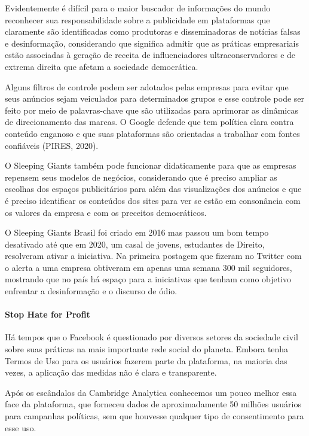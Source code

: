 Evidentemente é difícil para o maior buscador de informações do mundo
reconhecer sua responsabilidade sobre a publicidade em plataformas que
claramente são identificadas como produtoras e disseminadoras de
notícias falsas e desinformação, considerando que significa admitir que
as práticas empresariais estão associadas à geração de receita de
influenciadores ultraconservadores e de extrema direita que afetam a
sociedade democrática.

Alguns filtros de controle podem ser adotados pelas empresas para evitar
que seus anúncios sejam veiculados para determinados grupos e esse
controle pode ser feito por meio de palavras-chave que são utilizadas
para aprimorar as dinâmicas de direcionamento das marcas. O Google
defende que tem política clara contra conteúdo enganoso e que suas
plataformas são orientadas a trabalhar com fontes confiáveis (PIRES,
2020).

O Sleeping Giants também pode funcionar didaticamente para que as
empresas repensem seus modelos de negócios, considerando que é preciso
ampliar as escolhas dos espaços publicitários para além das
visualizações dos anúncios e que é preciso identificar os conteúdos dos
sites para ver se estão em consonância com os valores da empresa e com
os preceitos democráticos.

O Sleeping Giants Brasil foi criado em 2016 mas passou um bom tempo
desativado até que em 2020, um casal de jovens, estudantes de Direito,
resolveram ativar a iniciativa. Na primeira postagem que fizeram no
Twitter com o alerta a uma empresa obtiveram em apenas uma semana 300
mil seguidores, mostrando que no país há espaço para a iniciativas que
tenham como objetivo enfrentar a desinformação e o discurso de ódio.

\paragraph{Stop Hate for Profit}

Há tempos que o Facebook é questionado por diversos setores da sociedade
civil sobre suas práticas na mais importante rede social do planeta.
Embora tenha Termos de Uso para os usuários fazerem parte da plataforma,
na maioria das vezes, a aplicação das medidas não é clara e
transparente.

Após os escândalos da Cambridge Analytica conhecemos um pouco melhor
essa face da plataforma, que forneceu dados de aproximadamente 50
milhões usuários para campanhas políticas, sem que houvesse qualquer
tipo de consentimento para esse uso.

